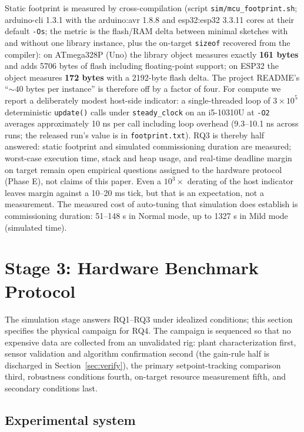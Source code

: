 \documentclass[10pt,twocolumn]{article}
\begin{document}
Static footprint is measured by cross-compilation (script \texttt{sim/mcu\_footprint.sh}; arduino-cli 1.3.1 with the arduino:avr 1.8.8 and esp32:esp32 3.3.11 cores at their default \texttt{-Os}; the metric is the flash/RAM delta between minimal sketches with and without one library instance, plus the on-target \texttt{sizeof} recovered from the compiler): on ATmega328P (Uno) the library object measures exactly \textbf{161 bytes} and adds 5706 bytes of flash including floating-point support; on ESP32 the object measures \textbf{172 bytes} with a 2192-byte flash delta. The project README's ``${\sim}40$ bytes per instance'' is therefore off by a factor of four. For compute we report a deliberately modest host-side indicator: a single-threaded loop of $3\times10^5$ deterministic \texttt{update()} calls under \texttt{steady\_clock} on an i5-10310U at \texttt{-O2} averages approximately 10 ns per call including loop overhead (9.3--10.1 ns across runs; the released run's value is in \texttt{footprint.txt}). RQ3 is thereby half answered: static footprint and simulated commissioning duration are measured; worst-case execution time, stack and heap usage, and real-time deadline margin on target remain open empirical questions assigned to the hardware protocol (Phase E), not claims of this paper. Even a $10^3\times$ derating of the host indicator leaves margin against a 10--20 ms tick, but that is an expectation, not a measurement. The measured cost of auto-tuning that simulation does establish is commissioning duration: 51--148 s in Normal mode, up to 1327 s in Mild mode (simulated time).

\section{Stage 3: Hardware Benchmark Protocol}
\label{sec:protocol}

The simulation stage answers RQ1--RQ3 under idealized conditions; this section specifies the physical campaign for RQ4. The campaign is sequenced so that no expensive data are collected from an unvalidated rig: plant characterization first, sensor validation and algorithm confirmation second (the gain-rule half is discharged in Section~\ref{sec:verify}), the primary setpoint-tracking comparison third, robustness conditions fourth, on-target resource measurement fifth, and secondary conditions last.

\subsection{Experimental system}
\end{document}
